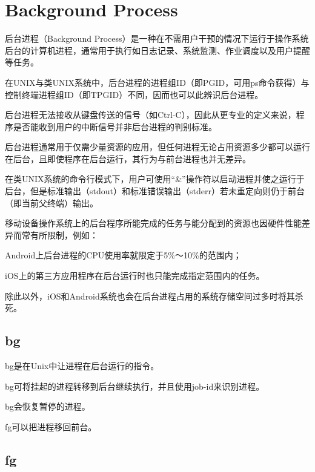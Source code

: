 \section{Background Process}

后台进程（Background Process）是一种在不需用户干预的情况下运行于操作系统后台的计算机进程，通常用于执行如日志记录、系统监测、作业调度以及用户提醒等任务。

在UNIX与类UNIX系统中，后台进程的进程组ID（即PGID，可用ps命令获得）与控制终端进程组ID（即TPGID）不同，因而也可以此辨识后台进程。

后台进程无法接收从键盘传送的信号（如Ctrl-C），因此从更专业的定义来说，程序是否能收到用户的中断信号并非后台进程的判别标准。

后台进程通常用于仅需少量资源的应用，但任何进程无论占用资源多少都可以运行在后台，且即使程序在后台运行，其行为与前台进程也并无差异。

在类UNIX系统的命令行模式下，用户可使用“\&”操作符以启动进程并使之运行于后台，但是标准输出（stdout）和标准错误输出（stderr）若未重定向则仍于前台（即当前父终端）输出。

移动设备操作系统上的后台程序所能完成的任务与能分配到的资源也因硬件性能差异而常有所限制，例如：

\begin{compactitem}
\item Android上后台进程的CPU使用率就限定于5\%～10\%的范围内；
\item iOS上的第三方应用程序在后台运行时也只能完成指定范围内的任务。
\end{compactitem}

除此以外，iOS和Android系统也会在后台进程占用的系统存储空间过多时将其杀死。




\subsection{bg}

bg是在Unix中让进程在后台运行的指令。

bg可将挂起的进程转移到后台继续执行，并且使用job-id来识别进程。

\begin{compactitem}
\item bg会恢复暂停的进程。
\item fg可以把进程移回前台。
\end{compactitem}



\subsection{fg}

